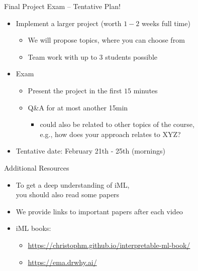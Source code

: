\documentclass[aspectratio=169]{../latex_main/tntbeamer}  %
\begin{document}
\begin{frame}[c]{Final Project Exam -- Tentative Plan!}

\begin{itemize}
  \item Implement a larger project (worth $1-2$ weeks full time)
  \begin{itemize}
 		\item We will propose topics, where you can choose from
 		\item Team work with up to $3$ students possible
  \end{itemize}
  \pause
  \item Exam
	\begin{itemize}
		\item Present the project in the first $15$ minutes
		\item Q\&A for at most another 15min
		    \begin{itemize}
		        \item could also be related to other topics of the course, \\
		        e.g., how does your approach relates to XYZ?
		    \end{itemize}
	\end{itemize}	
  \item Tentative date: February 21th - 25th (mornings)
\end{itemize}

\end{frame}
\begin{frame}[c]{Additional Resources}

\begin{itemize}
  \item To get a deep understanding of iML,\\ you should also read some papers 
  \item We provide links to important papers after each video
  \item iML books: 
  \begin{itemize}
      \item \url{https://christophm.github.io/interpretable-ml-book/}
      \item \url{https://ema.drwhy.ai/}
  \end{itemize}
\end{itemize}

\end{frame}
\end{document}
